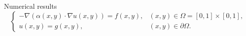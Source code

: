 \documentclass{beamer}
\begin{document}
\begin{frame}{Numerical results}
\begin{equation*}
	\begin{cases} -\nabla \left ( \alpha(x,y) \cdot \nabla u(x,y) \right ) = f(x,y), & (x,y) \in \Omega = [0,1] \times [0,1], \\
		u(x,y) = g(x,y), & (x,y) \in \partial \Omega. %
	\end{cases}
\end{equation*}
\begin{figure}
\end{figure}
\end{frame}
\end{document}
